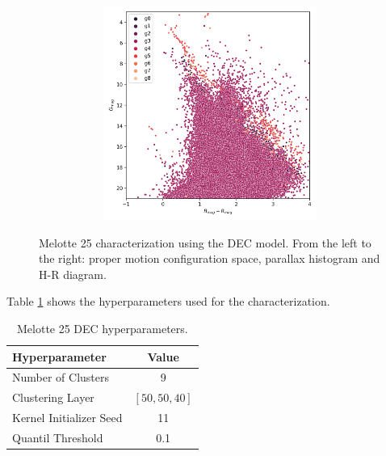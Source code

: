 \documentclass[11pt,a4paper,english,twocolumn]{article}
\begin{document}
\begin{figure}[htbp]
\begin{subfigure}{\columnwidth}
\begin{subfigure}[t]{0.30\textwidth}
    \end{subfigure}
    \hfill
    \begin{subfigure}[t]{0.30\textwidth}
      \centering
      \includegraphics[width=\textwidth]{../figures/melotte_25/dec_hr_diagram_melotte_25.png}
    \end{subfigure}
  \end{subfigure}
  \caption{Melotte 25 characterization using the DEC model.
           From the left to the right: proper motion configuration
           space, parallax histogram and H-R diagram.}
  \label{fig:result_melotte_25_dec}
\end{figure}

Table \ref{tab:hyperparameters_melotte_25} shows the hyperparameters
used for the characterization.

\begin{table}[h]
  \begin{center}
    \begin{tabular}{l|c}
      \textbf{Hyperparameter} & \textbf{Value} \\
      \hline
      Number of Clusters & 9 \\
      Clustering Layer & $\left[ 50, 50, 40 \right]$ \\
      Kernel Initializer Seed & 11 \\
      Quantil Threshold & 0.1 \\
    \end{tabular}
    \caption{Melotte 25 DEC hyperparameters.}
    \label{tab:hyperparameters_melotte_25}
  \end{center}
\end{table}
\end{document}
